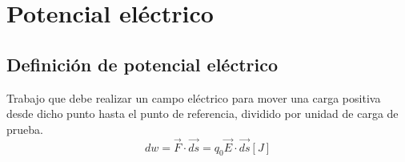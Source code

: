 \documentclass{report}
\begin{document}
  \section*{Potencial eléctrico}
    
    \subsection*{Definición de potencial eléctrico}
      Trabajo que debe realizar un campo eléctrico para mover una carga positiva desde dicho punto hasta el punto de 
      referencia, dividido por unidad de carga de prueba.
      \begin{equation*}
        dw=\overrightarrow{F}\cdot\overrightarrow{ds}=q_0\overrightarrow{E}\cdot\overrightarrow{ds}[J]
      \end{equation*}
\end{document}
